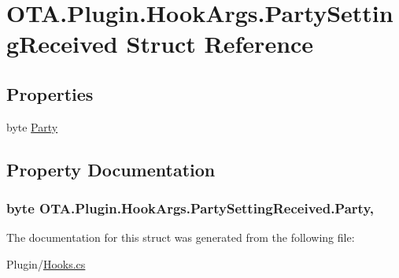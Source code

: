\hypertarget{struct_o_t_a_1_1_plugin_1_1_hook_args_1_1_party_setting_received}{}\section{O\+T\+A.\+Plugin.\+Hook\+Args.\+Party\+Setting\+Received Struct Reference}
\label{struct_o_t_a_1_1_plugin_1_1_hook_args_1_1_party_setting_received}
\subsection*{Properties}
\begin{DoxyCompactItemize}
\item 
byte \hyperlink{struct_o_t_a_1_1_plugin_1_1_hook_args_1_1_party_setting_received_acd5f427d55d70d4f82b3c63318e25086}{Party}
\end{DoxyCompactItemize}


\subsection{Property Documentation}
\hypertarget{struct_o_t_a_1_1_plugin_1_1_hook_args_1_1_party_setting_received_acd5f427d55d70d4f82b3c63318e25086}{}
\subsubsection[{Party}]{\setlength{\rightskip}{0pt plus 5cm}byte O\+T\+A.\+Plugin.\+Hook\+Args.\+Party\+Setting\+Received.\+Party\hspace{0.3cm}{\ttfamily [get]}, {\ttfamily [set]}}\label{struct_o_t_a_1_1_plugin_1_1_hook_args_1_1_party_setting_received_acd5f427d55d70d4f82b3c63318e25086}


The documentation for this struct was generated from the following file\+:\begin{DoxyCompactItemize}
\item 
Plugin/\hyperlink{_hooks_8cs}{Hooks.\+cs}\end{DoxyCompactItemize}
